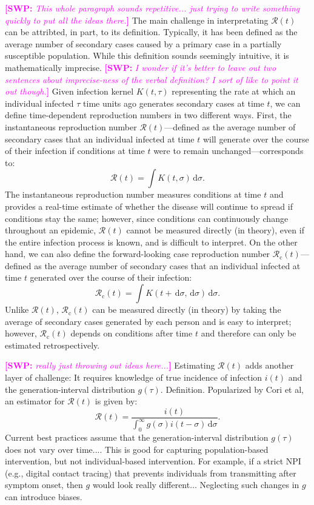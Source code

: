\documentclass[12pt]{article}
\newcommand{\comment}{\showcomment}
\newcommand{\showcomment}[3]{\textcolor{#1}{\textbf{[#2: }\textsl{#3}\textbf{]}}}
\newcommand{\swp}[1]{\comment{magenta}{SWP}{#1}}
\newcommand{\Rx}[1]{\ensuremath{{\mathcal R}_{#1}}\xspace}
\newcommand{\Rc}{\Rx{\mathrm{c}}}
\newcommand{\RR}{\ensuremath{{\mathcal R}}\xspace}
\newcommand{\dd}[1]{\ensuremath{\, \mathrm{d}#1}}
\newcommand{\dsigma}{\dd{\sigma}}
\begin{document}
\swp{This whole paragraph sounds repetitive... just trying to write something quickly to put all the ideas there.}
The main challenge in interpretating $\RR(t)$ can be attribted, in part, to its definition.
Typically, it has been defined as the average number of secondary cases caused by a primary case in a partially susceptible population.
While this definition sounds seemingly intuitive, it is mathematically imprecise.
\swp{I wonder if it's better to leave out two sentences about imprecise-ness of the verbal definition? I sort of like to point it out though.}
Given infection kernel $K(t, \tau)$ representing the rate at which an individual infected $\tau$ time units ago generates secondary cases at time $t$, we can define time-dependent reproduction numbers in two different ways.
First, the instantaneous reproduction number $\RR(t)$---defined as the average number of secondary cases that an individual infected at time $t$ will generate over the course of their infection if conditions at time $t$ were to remain unchanged---corresponds to:
\begin{equation}
\RR(t) = \int K(t, \sigma) \dsigma.
\end{equation}
The instantaneous reproduction number measures conditions at time $t$ and provides a real-time estimate of whether the disease will continue to spread if conditions stay the same;
however, since conditions can continuously change throughout an epidemic, $\RR(t)$ cannot be measured directly (in theory), even if the entire infection process is known, and is difficult to interpret.
On the other hand, we can also define the forward-looking case reproduction number $\Rc(t)$---defined as the average number of secondary cases that an individual infected at time $t$ generated over the course of their infection:
\begin{equation}
\Rc(t) = \int K(t+\dsigma, \dsigma) \dsigma.
\end{equation}
Unlike $\RR(t)$, $\Rc(t)$ can be measured directly (in theory) by taking the average of secondary cases generated by each person and is easy to interpret;
however, $\Rc(t)$ depends on conditions after time $t$ and therefore can only be estimated retrospectively.

\swp{really just throwing out ideas here...}
Estimating $\RR(t)$ adds another layer of challenge: 
It requires knowledge of true incidence of infection $i(t)$ and the generation-interval distribution $g(\tau)$. Definition.
Popularized by Cori et al, an estimator for $\RR(t)$ is given by:
\begin{equation}
\RR(t) = \frac{i(t)}{\int_0^\infty g(\sigma) i(t-\sigma) \dsigma}.
\end{equation}
Current best practices assume that the generation-interval distribution $g(\tau)$ does not vary over time....
This is good for capturing population-based intervention, but not individual-based intervention.
For example, if a strict NPI (e.g., digital contact tracing) that prevents individuals from transmitting after symptom onset, then $g$ would look really different...
Neglecting such changes in $g$ can introduce biases.
\end{document}
